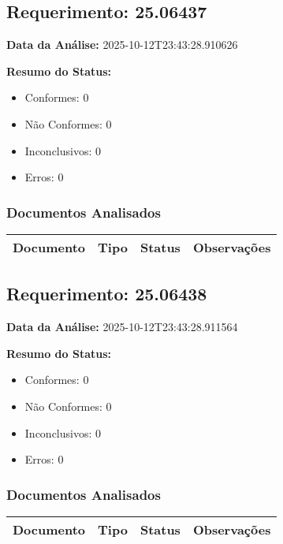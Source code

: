 \documentclass[12pt,a4paper]{article}
\begin{document}
\subsection{Requerimento: 25.06437}

\textbf{Data da Análise:} 2025-10-12T23:43:28.910626

\textbf{Resumo do Status:}
\begin{itemize}
    \item Conformes: 0
    \item Não Conformes: 0
    \item Inconclusivos: 0
    \item Erros: 0
\end{itemize}

\subsubsection{Documentos Analisados}

\begin{longtable}{|p{4cm}|p{2cm}|p{2cm}|p{6cm}|}
\hline
\textbf{Documento} & \textbf{Tipo} & \textbf{Status} & \textbf{Observações} \\
\hline
\endhead
\end{longtable}


\subsection{Requerimento: 25.06438}

\textbf{Data da Análise:} 2025-10-12T23:43:28.911564

\textbf{Resumo do Status:}
\begin{itemize}
    \item Conformes: 0
    \item Não Conformes: 0
    \item Inconclusivos: 0
    \item Erros: 0
\end{itemize}

\subsubsection{Documentos Analisados}

\begin{longtable}{|p{4cm}|p{2cm}|p{2cm}|p{6cm}|}
\hline
\textbf{Documento} & \textbf{Tipo} & \textbf{Status} & \textbf{Observações} \\
\hline
\endhead
\end{longtable}
\end{document}
